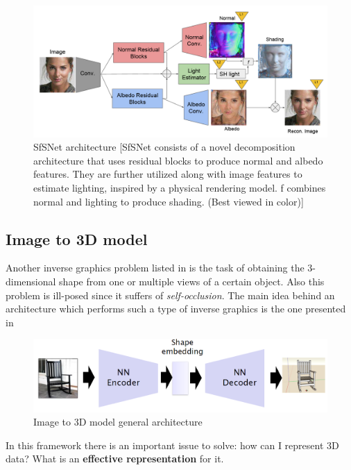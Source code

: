 \begin{figure}[h]
    \centering
    \includegraphics[scale=0.7]{img/SfSnet.png}
    \caption{SfSNet architecture [SfSNet consists of a novel decomposition architecture that uses residual blocks to produce normal and albedo features. They are further utilized along with image features to estimate lighting, inspired by a physical rendering model. f combines normal and lighting to produce shading. (Best viewed in color)]}    
\end{figure}

\subsection{Image to 3D model}
Another inverse graphics problem listed in  is the task of obtaining the 3-dimensional shape from one or multiple views of a certain object. Also this problem is ill-posed since it suffers of \textit{self-occlusion}. The main idea behind an architecture which performs such a type of inverse graphics is the one presented in 

\begin{figure}
    \centering
    \includegraphics[scale=0.5]{img/img23D.png}
    \caption{Image to 3D model general architecture}
    \label{fig:imgTo3D}
\end{figure}
In this framework there is an important issue to solve: how can I represent 3D data? What is an \textbf{effective representation} for it.


